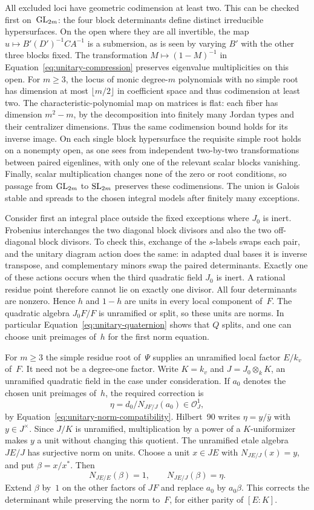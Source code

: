 All excluded loci have geometric codimension at least two.  This can
be checked first on~$\operatorname{GL}_{2m}$: the four block determinants define
distinct irreducible hypersurfaces.  On the open where they are all
invertible, the map
$u\mapsto B'(D')^{-1}CA^{-1}$ is a submersion, as is seen by varying
$B'$ with the other three blocks fixed.  The transformation
$M\mapsto(1-M)^{-1}$ in Equation~\eqref{eq:unitary-compression}
preserves eigenvalue multiplicities on this open.  For $m\geq3$, the locus of
monic degree-$m$ polynomials with no simple root has dimension at most
$\lfloor m/2\rfloor$ in coefficient space and thus codimension at
least two.  The characteristic-polynomial map on matrices is flat:
each fiber has dimension $m^2-m$, by the decomposition into finitely
many Jordan types and their centralizer dimensions.  Thus the same
codimension bound holds for its inverse image.  On each single block
hypersurface the requisite simple root holds on a nonempty open, as
one sees from independent two-by-two transformations between paired
eigenlines, with only one of the relevant scalar blocks vanishing.
Finally, scalar multiplication changes none of the zero or root
conditions, so passage from $\operatorname{GL}_{2m}$ to $\operatorname{SL}_{2m}$ preserves these
codimensions.  The union is Galois stable and spreads to the chosen
integral models after finitely many exceptions.

Consider first an integral place outside the fixed exceptions where
$J_0$ is inert.  Frobenius interchanges the two diagonal block
divisors and also the two off-diagonal block divisors.  To check
this, exchange of the $s$-labels swaps each pair, and the unitary
diagram action does the same: in adapted dual bases it is inverse
transpose, and complementary minors swap the paired determinants.
Exactly one of these actions occurs when the third quadratic field
$J_0$ is inert.  A rational residue point therefore cannot lie on
exactly one divisor.  All four determinants are nonzero.  Hence $h$
and $1-h$ are units in every local component of~$F$.  The quadratic
algebra $J_0F/F$ is unramified or split, so these units are norms.
In particular Equation~\eqref{eq:unitary-quaternion} shows that $Q$
splits, and one can choose unit preimages of~$h$ for the first norm
equation.

For $m\geq3$ the simple residue root of~$\Psi$ supplies an
unramified local factor $E/k_v$ of~$F$.  It need not be a degree-one
factor.  Write $K=k_v$ and $J=J_0\otimes_k K$, an unramified
quadratic field in the case under consideration.  If $a_0$ denotes
the chosen unit preimages of~$h$, the required correction is
\[
 \eta=d_0/N_{JF/J}(a_0)\in\mathcal O_J^1,
\]
by Equation~\eqref{eq:unitary-norm-compatibility}.  Hilbert~90 writes
$\eta=y/\bar y$ with $y\in J^\times$.  Since $J/K$ is unramified,
multiplication by a power of a $K$-uniformizer makes $y$ a unit
without changing this quotient.  The unramified etale algebra
$JE/J$ has surjective norm on units.  Choose a unit $x\in JE$ with
$N_{JE/J}(x)=y$, and put $\beta=x/x^*$.  Then
\[
 N_{JE/E}(\beta)=1,\qquad N_{JE/J}(\beta)=\eta.
\]
Extend $\beta$ by~$1$ on the other factors of $JF$ and replace
$a_0$ by $a_0\beta$.  This corrects the determinant while preserving
the norm to~$F$, for either parity of $[E:K]$.


